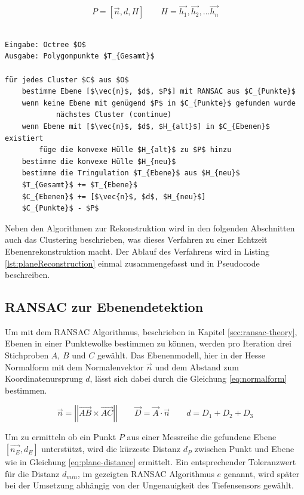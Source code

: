\begin{equation} \label{eq:plane}
P=\left[\vec{n}, d, H\right] \qquad H=\vec{h_1}, \vec{h_2}, \ldots  \vec{h_n}
\end{equation}

\begin{lstlisting}[mathescape,caption=Planaren Echtzeit Rekonstruktion, label=lst:planeReconstruction]

Eingabe: Octree $O$
Ausgabe: Polygonpunkte $T_{Gesamt}$

für jedes Cluster $C$ aus $O$
    bestimme Ebene [$\vec{n}$, $d$, $P$] mit RANSAC aus $C_{Punkte}$
    wenn keine Ebene mit genügend $P$ in $C_{Punkte}$ gefunden wurde
    		nächstes Cluster (continue)
    wenn Ebene mit [$\vec{n}$, $d$, $H_{alt}$] in $C_{Ebenen}$ existiert	
        füge die konvexe Hülle $H_{alt}$ zu $P$ hinzu	
    bestimme die konvexe Hülle $H_{neu}$
    bestimme die Tringulation $T_{Ebene}$ aus $H_{neu}$
    $T_{Gesamt}$ += $T_{Ebene}$
    $C_{Ebenen}$ += [$\vec{n}$, $d$, $H_{neu}$]
    $C_{Punkte}$ - $P$
\end{lstlisting}

Neben den Algorithmen zur Rekonstruktion wird in den folgenden Abschnitten auch das Clustering beschrieben, was dieses Verfahren zu einer Echtzeit Ebenenrekonstruktion macht. Der Ablauf des Verfahrens wird in Listing \ref{lst:planeReconstruction} einmal zusammengefasst und in Pseudocode beschreiben.

\subsection{RANSAC zur Ebenendetektion} \label{sec:ransac}

Um mit dem RANSAC Algorithmus, beschrieben in Kapitel \ref{sec:ransac-theory}, Ebenen in einer Punktewolke bestimmen zu können, werden pro Iteration drei Stichproben \(A\), \(B\) und \(C\) gewählt. Das Ebenenmodell, hier in der Hesse Normalform mit dem Normalenvektor \(\vec{n}\) und dem Abstand zum Koordinatenursprung \(d\), lässt sich dabei durch die Gleichung \ref{eq:normalform} bestimmen.

\begin{equation}\label{eq:normalform}
\vec{n} =\left|\left| \vec{AB} \times \vec{AC}\right|\right|
\qquad
\vec{D} = \vec{A} \cdot \vec{n}
\qquad
d = D_1 + D_2 + D_3
\end{equation}

Um zu ermitteln ob ein Punkt \(P\) aus einer Messreihe die gefundene Ebene \(\left[\vec{n_E}, d_E\right]\) unterstützt, wird die kürzeste Distanz \(d_P\) zwischen Punkt und Ebene wie in Gleichung \ref{eq:plane-distance} ermittelt.  Ein entsprechender Toleranzwert für die Distanz \(d_{min}\), im gezeigten RANSAC Algorithmus \(e\) genannt, wird später bei der Umsetzung abhängig von der Ungenauigkeit des Tiefensensors gewählt. 

